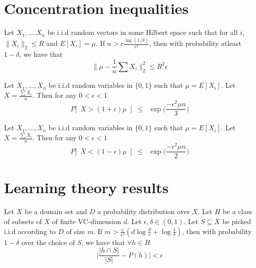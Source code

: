 \def\COMPLETE{}

\section{Concentration inequalities}
\label{appendixsection:conIneq}

\begin{theorem}
\label{thm:genHoeff}
Let $X_1, \ldots. X_n$ be i.i.d random vectors in some Hilbert space such that for all $i$, $\|X_i\|_2 \le R$ and $E[X_i] = \mu$. If $n > c\frac{\log(1/\delta)}{\epsilon^2}$, then with probability atleast $1-\delta$, we have that
$$\Big\|\mu - \frac{1}{n}\sum X_i\Big\|_2^2 \le R^2\epsilon$$ 
\end{theorem}

\begin{theorem}
\label{thm:chernoff}
Let $X_1, \ldots, X_n$ be i.i.d random variables in $\{0, 1\}$ such that $\mu = E[X_i]$. Let $X = \frac{\sum X_i}{n}$. Then for any $0 < \epsilon < 1$
$$P\big[ \enspace X > (1+\epsilon) \mu\enspace\big] \enspace\le\enspace \exp\bigg(\frac{-\epsilon^2\mu n}{3}\bigg)$$
\end{theorem}

\begin{theorem}
\label{thm:chernoff2}
Let $X_1, \ldots, X_n$ be i.i.d random variables in $\{0, 1\}$ such that $\mu = E[X_i]$. Let $X = \frac{\sum X_i}{n}$. Then for any $0 < \epsilon < 1$
$$P\big[ \enspace X < (1-\epsilon) \mu\enspace\big] \enspace\le\enspace \exp\bigg(\frac{-\epsilon^2\mu n}{2}\bigg)$$
\end{theorem}

\section{Learning theory results}
\begin{theorem}
\label{thm:vceapprox}
Let $X$ be a domain set and $D$ a probability distribution over $X$. Let $H$ be a class of subsets of $X$ of finite VC-dimension $d$. Let $\epsilon, \delta \in (0,1)$. Let $S \subseteq X$ be picked i.i.d according to $D$ of size $m$. If $m > \frac{c}{\epsilon^2}(d\log \frac{d}{\epsilon}+\log\frac{1}{\delta})$, then  with probability $1-\delta$ over the choice of $S$, we have that $\forall h \in H$
$$\bigg|\frac{|h\cap S|}{|S|} - P(h)\bigg| < \epsilon$$
\end{theorem}

